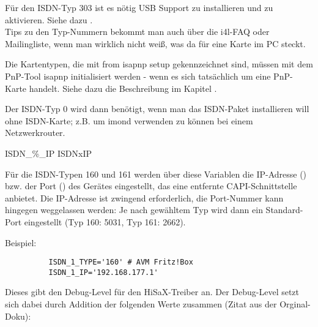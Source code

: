 \begin{description}
  Für den ISDN-Typ 303 ist es nötig USB Support zu 
  installieren und zu aktivieren. Siehe dazu 
  .\\

  Tips zu den Typ-Nummern bekommt man auch über die i4l-FAQ oder
  Mailingliste, wenn man wirklich nicht weiß, was da für eine Karte im
  PC steckt.

  Die Kartentypen, die mit \glqq{}from isapnp setup\grqq{} gekennzeichnet sind,
  müssen mit dem PnP-Tool isapnp initialisiert werden - wenn es sich
  tatsächlich um eine PnP-Karte handelt. Siehe dazu die Beschreibung im Kapitel
  .

  Der ISDN-Typ 0 wird dann benötigt, wenn man das ISDN-Paket installieren will
  ohne ISDN-Karte; z.B. um imond verwenden zu können bei einem Netzwerkrouter.

 {ISDN\_\%\_IP} {ISDNxIP}

  Für die ISDN-Typen 160 und 161 werden über diese Variablen die IP-Adresse
  () bzw. der Port () des Gerätes
  eingestellt, das eine entfernte CAPI-Schnittstelle anbietet. Die IP-Adresse
  ist zwingend erforderlich, die Port-Nummer kann hingegen weggelassen werden:
  Je nach gewähltem Typ wird dann ein Standard-Port eingestellt (Typ 160: 5031,
  Typ 161: 2662).

  Beispiel:
  \begin{example}
  \begin{verbatim}
          ISDN_1_TYPE='160' # AVM Fritz!Box
          ISDN_1_IP='192.168.177.1'
  \end{verbatim}
  \end{example}

  
  Dieses gibt den Debug-Level für den HiSaX-Treiber an.
  Der Debug-Level setzt sich dabei durch Addition der folgenden Werte
  zusammen (Zitat aus der Orginal-Doku):\\
  

\end{description}

